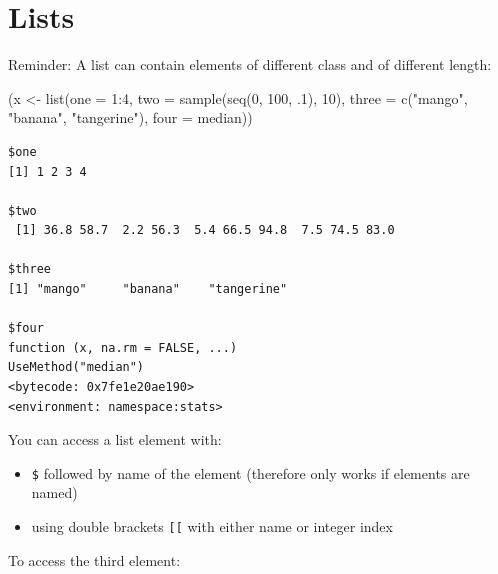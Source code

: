 \documentclass[
]{book}
\newenvironment{Shaded}{\begin{snugshade}}{\end{snugshade}}
\newcommand{\AttributeTok}[1]{\textcolor[rgb]{0.77,0.63,0.00}{#1}}
\newcommand{\DecValTok}[1]{\textcolor[rgb]{0.00,0.00,0.81}{#1}}
\newcommand{\FunctionTok}[1]{\textcolor[rgb]{0.00,0.00,0.00}{#1}}
\newcommand{\NormalTok}[1]{#1}
\newcommand{\OtherTok}[1]{\textcolor[rgb]{0.56,0.35,0.01}{#1}}
\newcommand{\SpecialCharTok}[1]{\textcolor[rgb]{0.00,0.00,0.00}{#1}}
\newcommand{\StringTok}[1]{\textcolor[rgb]{0.31,0.60,0.02}{#1}}
\providecommand{\tightlist}{%
  \setlength{\itemsep}{0pt}\setlength{\parskip}{0pt}}
\begin{document}
\hypertarget{indexlists}{%
\section{Lists}\label{indexlists}}

Reminder: A list can contain elements of different class and of different length:

\begin{Shaded}
\begin{Highlighting}[]
\NormalTok{(x }\OtherTok{\textless{}{-}} \FunctionTok{list}\NormalTok{(}\AttributeTok{one =} \DecValTok{1}\SpecialCharTok{:}\DecValTok{4}\NormalTok{,}
           \AttributeTok{two =} \FunctionTok{sample}\NormalTok{(}\FunctionTok{seq}\NormalTok{(}\DecValTok{0}\NormalTok{, }\DecValTok{100}\NormalTok{, .}\DecValTok{1}\NormalTok{), }\DecValTok{10}\NormalTok{),}
           \AttributeTok{three =} \FunctionTok{c}\NormalTok{(}\StringTok{"mango"}\NormalTok{, }\StringTok{"banana"}\NormalTok{, }\StringTok{"tangerine"}\NormalTok{),}
           \AttributeTok{four =}\NormalTok{ median))}
\end{Highlighting}
\end{Shaded}

\begin{verbatim}
$one
[1] 1 2 3 4

$two
 [1] 36.8 58.7  2.2 56.3  5.4 66.5 94.8  7.5 74.5 83.0

$three
[1] "mango"     "banana"    "tangerine"

$four
function (x, na.rm = FALSE, ...) 
UseMethod("median")
<bytecode: 0x7fe1e20ae190>
<environment: namespace:stats>
\end{verbatim}

You can access a list element with:

\begin{itemize}
\tightlist
\item
  \texttt{\$} followed by name of the element (therefore only works if elements are named)
\item
  using double brackets \texttt{{[}{[}} with either name or integer index
\end{itemize}

To access the third element:

\begin{Shaded}
\end{Shaded}
\end{document}
